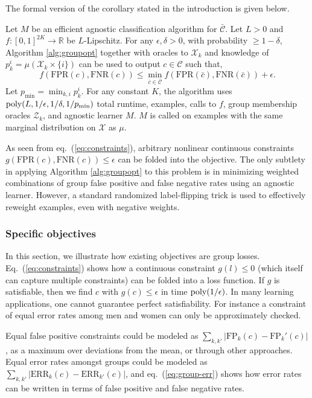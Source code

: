 \documentclass[final, 12pt]{colt2018} %
\def\reals{{\mathbb R}}
\newcommand{\eps}{\epsilon}
\newcommand{\pmin}{p_{\text{min}}}
\def\calC{\mathcal{C}}
\def\calX{\mathcal{X}}
\def\calZ{\mathcal{Z}}
\def\ERR{\mathrm{ERR}}
\def\FP{\mathrm{FP}}
\def\FPR{\mathrm{FPR}}
\def\FNR{\mathrm{FNR}}
\newcommand{\poly}{\mathop{\mbox{\text{poly}}}}
\begin{document}
The formal version of the corollary stated in the introduction is given below.  
\begin{corollary}\label{cor:classification}
Let $M$ be an efficient agnostic classification algorithm for $\bar{\calC}$. Let $L>0$ and $f:[0,1]^{2K} \rightarrow \reals$ be $L$-Lipschitz. For any $\eps, \delta>0$, with probability $\geq 1-\delta$, Algorithm \ref{alg:groupopt} together with oracles to $\calX_k$ and knowledge of $p_k^i=\mu(\calX_k \times \{i\})$ can be used to output $c \in \calC$  such that,
$$f(\FPR(c), \FNR(c))\leq \min_{\bar{c}\in \bar{\calC}} f(\FPR(\bar{c}), \FNR(\bar{c}))+\eps.$$
Let $\pmin = \min_{k,i} p_k^i$. For any constant $K$, the algorithm uses $\poly(L, 1/\eps, 1/\delta,  1/\pmin)$ total runtime, examples, calls to $f$, group membership oracles $\calZ_k$, and agnostic learner $M$. $M$ is called on examples with the same marginal distribution on $\calX$ as $\mu$. 
\end{corollary}
As seen from eq.~(\ref{eq:constraints}), arbitrary nonlinear continuous constraints $g(\FPR(c), \FNR(c))\leq \eps$ can be folded into the objective. The only subtlety in applying Algorithm \ref{alg:groupopt} to this problem is in minimizing weighted combinations of group false positive and false negative rates using an agnostic learner. However, a standard randomized label-flipping trick is used to effectively reweight examples, even with negative weights.  
 


\subsubsection{Specific objectives}

In this section, we illustrate how existing objectives are group losses. Eq.~(\ref{eq:constraints}) shows how a continuous constraint $g(l) \leq 0$ (which itself can capture multiple constraints) can be folded into a loss function. If $g$ is satisfiable, then we find $c$ with $g(c) \leq \eps$ in time $\poly(1/\eps)$. In many learning applications, one cannot guarantee perfect satisfiability. For instance a constraint of equal error rates among men and women can only be approximately checked.

Equal false positive constraints could be modeled as $\sum_{k,k'} |\FP_k(c)-\FP_k'(c)|$, as a maximum over deviations from the mean, or through other approaches. Equal error rates amongst groups could be modeled as $\sum_{k,k'} |\ERR_k(c)-\ERR_{k'}(c)|$, and eq.~(\ref{eq:group-err}) shows how error rates can be written in terms of false positive and false negative rates. 
\end{document}
